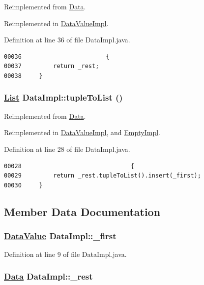 Reimplemented from \hyperlink{interfaceData_a3}{Data}.

Reimplemented in \hyperlink{classDataValueImpl_a1}{Data\-Value\-Impl}.

Definition at line 36 of file Data\-Impl.java.\footnotesize\begin{verbatim}00036                        {
00037         return _rest;
00038     }
\end{verbatim}\normalsize 
\hypertarget{classDataImpl_a1}{
\subsubsection[tupleToList]{\setlength{\rightskip}{0pt plus 5cm}\hyperlink{interfaceList}{List} Data\-Impl::tuple\-To\-List ()}}
\label{classDataImpl_a1}




Reimplemented from \hyperlink{interfaceData_a1}{Data}.

Reimplemented in \hyperlink{classDataValueImpl_a2}{Data\-Value\-Impl}, and \hyperlink{classEmptyImpl_a1}{Empty\-Impl}.

Definition at line 28 of file Data\-Impl.java.\footnotesize\begin{verbatim}00028                               {
00029         return _rest.tupleToList().insert(_first);
00030     }
\end{verbatim}\normalsize 


\subsection{Member Data Documentation}
\hypertarget{classDataImpl_n0}{
\subsubsection[\_\-first]{\setlength{\rightskip}{0pt plus 5cm}\hyperlink{interfaceDataValue}{Data\-Value} Data\-Impl::\_\-first}}
\label{classDataImpl_n0}




Definition at line 9 of file Data\-Impl.java.\hypertarget{classDataImpl_n1}{
\subsubsection[\_\-rest]{\setlength{\rightskip}{0pt plus 5cm}\hyperlink{interfaceData}{Data} Data\-Impl::\_\-rest}}
\label{classDataImpl_n1}




